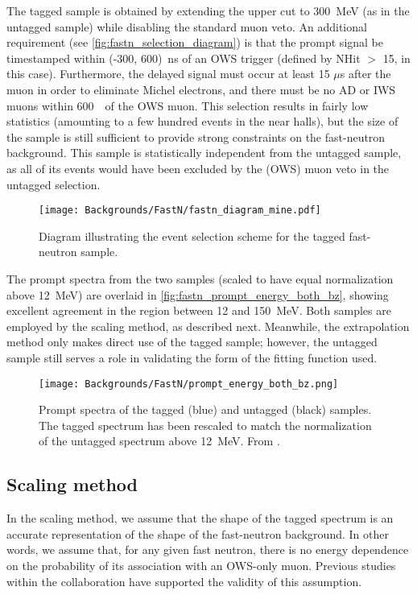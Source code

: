 \documentclass[../thesis.tex]{subfiles}
\begin{document}
The tagged sample is obtained by extending the upper cut to 300~MeV (as in the untagged sample) while disabling the standard muon veto. An additional requirement (see \autoref{fig:fastn_selection_diagram}) is that the prompt signal be timestamped within (-300, 600)~ns of an OWS trigger (defined by NHit $>$ 15, in this case). Furthermore, the delayed signal must occur at least 15 $\mu$s after the muon in order to eliminate Michel electrons, and there must be no AD or IWS muons within 600~\us\ of the OWS muon. This selection results in fairly low statistics (amounting to a few hundred events in the near halls), but the size of the sample is still sufficient to provide strong constraints on the fast-neutron background. This sample is statistically independent from the untagged sample, as all of its events would have been excluded by the (OWS) muon veto in the untagged selection.

\begin{figure}[h]
  \texttt{[image: Backgrounds/FastN/fastn\_diagram\_mine.pdf]}
  \caption{Diagram illustrating the event selection scheme for the tagged fast-neutron sample.}
  \label{fig:fastn_selection_diagram}
\end{figure}

The prompt spectra from the two samples (scaled to have equal normalization above 12~MeV) are overlaid in \autoref{fig:fastn_prompt_energy_both_bz}, showing excellent agreement in the region between 12 and 150~MeV. Both samples are employed by the scaling method, as described next. Meanwhile, the extrapolation method only makes direct use of the tagged sample; however, the untagged sample still serves a role in validating the form of the fitting function used.

\begin{figure}[h]
  \texttt{[image: Backgrounds/FastN/prompt\_energy\_both\_bz.png]}
  \caption{Prompt spectra of the tagged (blue) and untagged (black) samples. The tagged spectrum has been rescaled to match the normalization of the untagged spectrum above 12~MeV. From \cite{fastn}.}
  \label{fig:fastn_prompt_energy_both_bz}
\end{figure}

\subsection{Scaling method}
\label{sec:fastn_scaling}

In the scaling method, we assume that the shape of the tagged spectrum is an accurate representation of the shape of the fast-neutron background. In other words, we assume that, for any given fast neutron, there is no energy dependence on the probability of its association with an OWS-only muon. Previous studies within the collaboration have supported the validity of this assumption.
\end{document}
